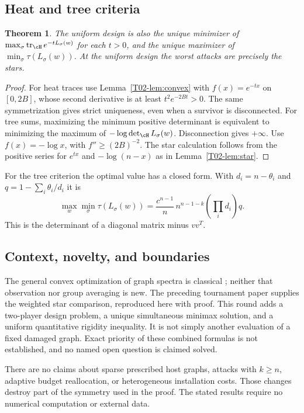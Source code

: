 \documentclass[11pt,a4paper]{article}
\newtheorem{theorem}{Theorem}[section]
\theoremstyle{definition}\newtheorem{definition}[theorem]{Definition}
\theoremstyle{remark}\newtheorem{remark}[theorem]{Remark}
\DeclareMathOperator{\tr}{tr}\DeclareMathOperator{\supp}{supp}\DeclareMathOperator{\TV}{TV}
\numberwithin{equation}{section}
\begin{document}
\subsection{Heat and tree criteria}\label{T02-sec-5}
\begin{theorem}
The uniform design is also the unique minimizer of
$\max_\sigma\tr_{\cH}e^{-tL_\sigma(w)}$ for each $t>0$, and the unique maximizer of $\min_\sigma\tau(L_\sigma(w))$. At the uniform design the worst attacks are precisely the stars.
\end{theorem}
\begin{proof}
For heat traces use Lemma~\ref{T02-lem:convex} with $f(x)=e^{-tx}$ on $[0,2B]$, whose second derivative is at least $t^2e^{-2Bt}>0$. The same symmetrization gives strict uniqueness, even when a survivor is disconnected. For tree sums, maximizing the minimum positive determinant is equivalent to minimizing the maximum of $-\log\det_{\cH}L_\sigma(w)$. Disconnection gives $+\infty$. Use $f(x)=-\log x$, with $f''\ge(2B)^{-2}$. The star calculation follows from the positive series for $e^{tx}$ and $-\log(n-x)$ as in Lemma~\ref{T02-lem:star}.
\end{proof}
For the tree criterion the optimal value has a closed form. With $d_i=n-\theta_i$ and $q=1-\sum_i\theta_i/d_i$ it is
\[
 \max_w\min_\sigma\tau(L_\sigma(w))
 =\frac{c^{n-1}}n\,n^{n-1-k}\left(\prod_i d_i\right)q.
\]
This is the determinant of a diagonal matrix minus $vv^T$.

\subsection{Context, novelty, and boundaries}\label{T02-sec-6}
The general convex optimization of graph spectra is classical \cite{ref039,ref036}; neither that observation nor group averaging is new. The preceding tournament paper \cite{ref040} supplies the weighted star comparison, reproduced here with proof. This round adds a two-player design problem, a unique simultaneous minimax solution, and a uniform quantitative rigidity inequality. It is not simply another evaluation of a fixed damaged graph. Exact priority of these combined formulas is not established, and no named open question is claimed solved.

There are no claims about sparse prescribed host graphs, attacks with $k\ge n$, adaptive budget reallocation, or heterogeneous installation costs. Those changes destroy part of the symmetry used in the proof. The stated results require no numerical computation or external data.
\end{document}

